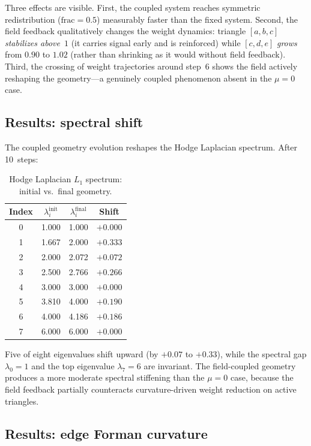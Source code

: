 \documentclass[11pt]{article}
\begin{document}
Three effects are visible.  First, the coupled system reaches symmetric redistribution ($\text{frac}=0.5$) measurably faster than the fixed system.  Second, the field feedback qualitatively changes the weight dynamics: triangle $[a,b,c]$ \emph{stabilizes above}~$1$ (it carries signal early and is reinforced) while $[c,d,e]$ \emph{grows} from $0.90$ to $1.02$ (rather than shrinking as it would without field feedback).  Third, the crossing of weight trajectories around step~6 shows the field actively reshaping the geometry---a genuinely coupled phenomenon absent in the $\mu=0$ case.

\subsection{Results: spectral shift}

The coupled geometry evolution reshapes the Hodge Laplacian spectrum.  After 10~steps:

\begin{table}[ht]
\centering
\small
\caption{Hodge Laplacian $L_1$ spectrum: initial vs.\ final geometry.}
\label{tab:spectrum}
\begin{tabular}{cccc}
\toprule
Index & $\lambda_i^{\mathrm{init}}$ & $\lambda_i^{\mathrm{final}}$ & Shift \\
\midrule
0 & 1.000 & 1.000 & $+0.000$ \\
1 & 1.667 & 2.000 & $+0.333$ \\
2 & 2.000 & 2.072 & $+0.072$ \\
3 & 2.500 & 2.766 & $+0.266$ \\
4 & 3.000 & 3.000 & $+0.000$ \\
5 & 3.810 & 4.000 & $+0.190$ \\
6 & 4.000 & 4.186 & $+0.186$ \\
7 & 6.000 & 6.000 & $+0.000$ \\
\bottomrule
\end{tabular}
\end{table}

Five of eight eigenvalues shift upward (by $+0.07$ to $+0.33$), while the spectral gap $\lambda_0=1$ and the top eigenvalue $\lambda_7=6$ are invariant.  The field-coupled geometry produces a more moderate spectral stiffening than the $\mu=0$ case, because the field feedback partially counteracts curvature-driven weight reduction on active triangles.

\subsection{Results: edge Forman curvature}
\end{document}
